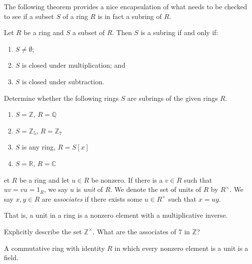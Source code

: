 \documentclass[english,course]{lecture}
\theoremstyle{plain}
\newenvironment{definition}[1]
  {\renewcommand\theinnerdefinition{#1}\innerdefinition}
  {\endinnerdefinition}
\def\C{{\mathbb C}}
\def\Z{{\mathbb Z}}
\def\Q{{\mathbb Q}}
\def\R{{\mathbb R}}
\def\presnotes{}
\begin{document}
The following theorem provides a nice encapsulation of what needs to be checked to see if a subset $S$ of a ring $R$ is in fact a subring of $R$.

\begin{theorem}\label{theorem:subringtest}
	Let $R$ be a ring and $S$ a subset of $R$.
	Then $S$ is a subring if and only if:
	\begin{enumerate}
	\item $S\ne \emptyset$;
	\item $S$ is closed under multiplication; and
	\item $S$ is closed under subtraction.
\end{enumerate}
\end{theorem}


\presnotes


\begin{exer}
	Determine whether the following rings $S$ are subrings of the given rings $R$.
	\begin{enumerate}
		\item $S = \Z$, $R = \Q$
		\item $S = \Z_{5}$, $R = \Z_{7}$
		\item $S$ is any ring, $R = S[x]$
		\item $S = \R$, $R = \C$
	\end{enumerate}
\end{exer}

\presnotes



\begin{definition}
	Let $R$ be a ring and let $u\in R$ be nonzero.
	If there is a $v\in R$ such that $uv = vu = 1_R$, we say $u$ is \emph{unit} of $R$.
	We denote the set of units of $R$ by $R^\times$.
	We say $x,y\in R$ are \emph{associates} if there exists some $u\in R^\times$ such that $x = uy$.
\end{definition}

That is, a unit in a ring is a nonzero element with a multiplicative inverse.



\begin{exer}
	Explicitly describe the set $\Z^\times$.
	What are the associates of 7 in $\Z$?
\end{exer}

\presnotes

\begin{theorem}
	A commutative ring with identity $R$ in which every nonzero element is a unit is a field.
\end{theorem}
\end{document}
